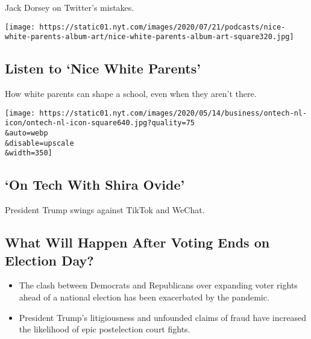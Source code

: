 Jack Dorsey on Twitter's mistakes.

\href{/2020/08/06/podcasts/episode-three-this-is-our-school-how-dare-you.html}{}

\texttt{[image: https://static01.nyt.com/images/2020/07/21/podcasts/nice-white-parents-album-art/nice-white-parents-album-art-square320.jpg]}

\href{/2020/08/06/podcasts/episode-three-this-is-our-school-how-dare-you.html}{}

\hypertarget{listen-to-nice-white-parents}{%
\subsection{Listen to `Nice White
Parents'}\label{listen-to-nice-white-parents}}

How white parents can shape a school, even when they aren't there.

\href{/2020/08/07/technology/trump-tiktok-wechat.html}{}

\texttt{[image: https://static01.nyt.com/images/2020/05/14/business/ontech-nl-icon/ontech-nl-icon-square640.jpg?quality=75\\\&auto=webp\\\&disable=upscale\\\&width=350]}

\href{/2020/08/07/technology/trump-tiktok-wechat.html}{}

\hypertarget{on-tech-with-shira-ovide}{%
\subsection{`On Tech With Shira Ovide'}\label{on-tech-with-shira-ovide}}

President Trump swings against TikTok and WeChat.

\href{/2020/08/08/us/politics/voting-nov-3-election.html}{}

\hypertarget{what-will-happen-after-voting-ends-on-election-day}{%
\subsection{What Will Happen After Voting Ends on Election
Day?}\label{what-will-happen-after-voting-ends-on-election-day}}

\begin{itemize}
\tightlist
\item
  The clash between Democrats and Republicans over expanding voter
  rights ahead of a national election has been exacerbated by the
  pandemic.
\item
  President Trump's litigiousness and unfounded claims of fraud have
  increased the likelihood of epic postelection court fights.
\end{itemize}

